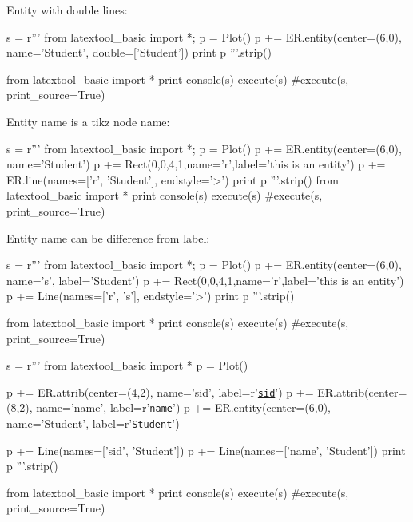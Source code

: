 Entity with double lines:
\begin{python}
s = r'''
from latextool_basic import *; p = Plot()
p += ER.entity(center=(6,0), name='Student', double=['Student'])
print p
'''.strip()

from latextool_basic import *
print console(s)
execute(s)
#execute(s, print_source=True)
\end{python}

Entity name is a tikz node name:
\begin{python}
s = r'''
from latextool_basic import *; p = Plot()
p += ER.entity(center=(6,0), name='Student')
p += Rect(0,0,4,1,name='r',label='this is an entity')
p += ER.line(names=['r', 'Student'], endstyle='>')
print p
'''.strip()
from latextool_basic import *
print console(s)
execute(s)
#execute(s, print_source=True)
\end{python}

Entity name can be difference from label:
\begin{python}
s = r'''
from latextool_basic import *; p = Plot()
p += ER.entity(center=(6,0), name='s', label='Student')
p += Rect(0,0,4,1,name='r',label='this is an entity')
p += Line(names=['r', 's'], endstyle='>')
print p
'''.strip()

from latextool_basic import *
print console(s)
execute(s)
#execute(s, print_source=True)
\end{python}

\newpage
\begin{python}
s = r'''
from latextool_basic import *
p = Plot()

p += ER.attrib(center=(4,2), name='sid', label=r'\texttt{\underline{sid}}')
p += ER.attrib(center=(8,2), name='name', label=r'\texttt{name}')
p += ER.entity(center=(6,0), name='Student', label=r'\texttt{Student}')

p += Line(names=['sid', 'Student'])
p += Line(names=['name', 'Student'])
print p
'''.strip()

from latextool_basic import *
print console(s)
execute(s)
#execute(s, print_source=True)
\end{python}

